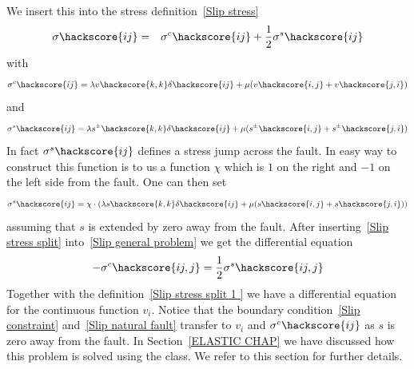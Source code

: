 We insert this into the stress definition~\ref{Slip  stress}
\begin{eqnarray} \label{Slip  stress split}
\sigma\hackscore{ij} & = &
\sigma^c\hackscore{ij} + 
\frac{1}{2} \sigma^s\hackscore{ij}
\end{eqnarray}
 with 
\begin{eqnarray} \label{Slip  stress split 1 }
\sigma^c\hackscore{ij} = \lambda v\hackscore{k,k} \delta\hackscore{ij} + \mu ( v\hackscore{i,j} + v\hackscore{j,i})
\end{eqnarray}
and 
\begin{eqnarray} \label{Slip  stress split 2 }
\sigma^s\hackscore{ij} = \lambda s^{\pm}\hackscore{k,k} \delta\hackscore{ij} + \mu ( s^{\pm}\hackscore{i,j} + s^{\pm}\hackscore{j,i})
\end{eqnarray}
In fact $\sigma^s\hackscore{ij}$ defines a stress jump across the fault. In easy way to construct this 
function is to us a function $\chi$ which is $1$ on the right and $-1$ on the left side from the fault. One can then
set 
\begin{eqnarray} \label{Slip  stress split 23 }
\sigma^s\hackscore{ij} = \chi \cdot  ( \lambda s\hackscore{k,k} \delta\hackscore{ij} + \mu ( s\hackscore{i,j} + s\hackscore{j,i}) )
\end{eqnarray}
assuming that $s$ is extended by zero away from the fault. After inserting~\ref{Slip  stress split} into~\ref{Slip general problem} we get the differential equation
\begin{eqnarray}\label{Slip general problem 2 }
- \sigma^c\hackscore{ij,j}=\frac{1}{2} \sigma^s\hackscore{ij,j}
\end{eqnarray}
Together with the definition~\ref{Slip  stress split 1 } we have a differential equation for the
continuous function $v_i$. Notice that the boundary condition~\ref{Slip constraint}
and~\ref{Slip natural fault} transfer to $v_i$ and $\sigma^c\hackscore{ij}$ as 
$s$ is zero away from the fault. In Section~\ref{ELASTIC CHAP} we have discussed how this problem
is solved using the \LinearPDE class. We refer to this section for further details. 

